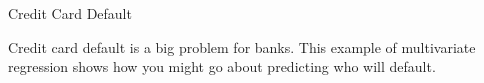 \documentclass[11pt]{beamer}
\begin{document}
\begin{frame}{
	\begin{minipage}[t]{0.55\textwidth}
		Credit Card Default
	\end{minipage}
	\hfill
	\begin{minipage}[t]{0.35\textwidth}
		\flushright
	\end{minipage}
}{}
Credit card default is a big problem for banks. This example of multivariate regression shows how you might go about predicting who will default.
\begin{center}
	
\end{center}
\end{frame}
\end{document}
